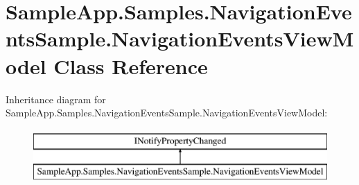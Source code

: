 \hypertarget{class_sample_app_1_1_samples_1_1_navigation_events_sample_1_1_navigation_events_view_model}{}\section{Sample\+App.\+Samples.\+Navigation\+Events\+Sample.\+Navigation\+Events\+View\+Model Class Reference}
\label{class_sample_app_1_1_samples_1_1_navigation_events_sample_1_1_navigation_events_view_model}
Inheritance diagram for Sample\+App.\+Samples.\+Navigation\+Events\+Sample.\+Navigation\+Events\+View\+Model\+:\begin{figure}[H]
\begin{center}
\leavevmode
\includegraphics[height=2.000000cm]{class_sample_app_1_1_samples_1_1_navigation_events_sample_1_1_navigation_events_view_model}
\end{center}
\end{figure}
